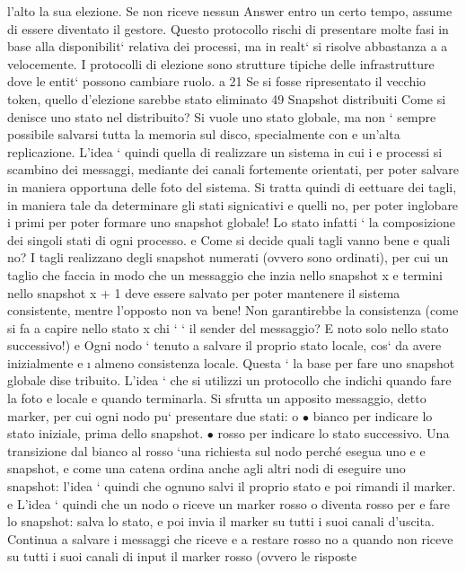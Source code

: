 \documentclass[a4paper,12pt]{article}
\begin{document}
l'alto la sua elezione. Se non riceve nessun Answer entro un certo tempo, assume
di essere diventato il gestore. Questo protocollo rischi di presentare molte fasi
in base alla disponibilit` relativa dei processi, ma in realt` si risolve abbastanza
a
a
velocemente. I protocolli di elezione sono strutture tipiche delle infrastrutture
dove le entit` possono cambiare ruolo.
a
21 Se
si fosse ripresentato il vecchio token, quello d'elezione sarebbe stato eliminato
49
Snapshot distribuiti
Come si denisce uno stato nel distribuito? Si vuole uno stato globale, ma
non ` sempre possibile salvarsi tutta la memoria sul disco, specialmente con
e
un'alta replicazione. L'idea ` quindi quella di realizzare un sistema in cui i
e
processi si scambino dei messaggi, mediante dei canali fortemente orientati, per
poter salvare in maniera opportuna delle foto del sistema. Si tratta quindi di
eettuare dei tagli, in maniera tale da determinare gli stati signicativi e quelli
no, per poter inglobare i primi per poter formare uno snapshot globale! Lo stato
infatti ` la composizione dei singoli stati di ogni processo.
e
Come si decide quali tagli vanno bene e quali no? I tagli realizzano degli
snapshot numerati (ovvero sono ordinati), per cui un taglio che faccia in modo
che un messaggio che inzia nello snapshot x e termini nello snapshot x + 1 deve
essere salvato per poter mantenere il sistema consistente, mentre l'opposto non
va bene! Non garantirebbe la consistenza (come si fa a capire nello stato x chi
`
` il sender del messaggio? E noto solo nello stato successivo!)
e
Ogni nodo ` tenuto a salvare il proprio stato locale, cos` da avere inizialmente
e
\i{}
almeno consistenza locale. Questa ` la base per fare uno snapshot globale dise
tribuito. L'idea ` che si utilizzi un protocollo che indichi quando fare la foto
e
locale e quando terminarla. Si sfrutta un apposito messaggio, detto marker, per
cui ogni nodo pu` presentare due stati:
o
$\bullet$ bianco per indicare lo stato iniziale, prima dello snapshot.
$\bullet$ rosso per indicare lo stato successivo.
Una transizione dal bianco al rosso `una richiesta sul nodo perché esegua uno
e
e
snapshot, e come una catena ordina anche agli altri nodi di eseguire uno snapshot: l'idea ` quindi che ognuno salvi il
proprio stato e poi rimandi il marker.
e
L'idea ` quindi che un nodo o riceve un marker rosso o diventa rosso per
e
fare lo snapshot: salva lo stato, e poi invia il marker su tutti i suoi canali
d'uscita. Continua a salvare i messaggi che riceve e a restare rosso no a quando
non riceve su tutti i suoi canali di input il marker rosso (ovvero le risposte
\end{document}

